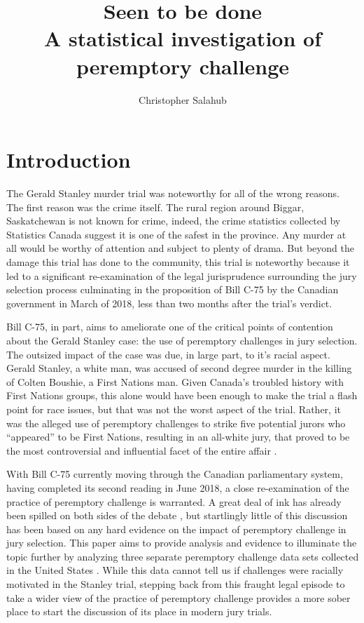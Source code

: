 \documentclass{article}
\title{Seen to be done\\
\large A statistical investigation of peremptory challenge}
\author{Christopher Salahub}
\begin{document}
\maketitle

\section{Introduction} \label{sec:Intro}

The Gerald Stanley murder trial was noteworthy for all of the wrong reasons. The first reason was the crime itself. The rural
region around Biggar, Saskatchewan\cite{StanleyWitnessAccounts} is not known for crime, indeed, the crime statistics collected by
Statistics Canada suggest it is one of the safest in the province\cite{SaskatchewanCrime}. Any murder at all would be worthy of
attention and subject to plenty of drama. But beyond the damage this trial has done to the community, this trial is noteworthy
because it led to a significant re-examination of the legal jurisprudence surrounding the jury selection process culminating in
the proposition of Bill C-75 by the Canadian government in March of 2018\cite{billc75}, less than two months after the trial's
verdict\cite{GeraldStanleyVerdict}.

Bill C-75, in part, aims to ameliorate one of the critical points of contention about the Gerald Stanley case: the use of
peremptory challenges in jury selection. The outsized impact of the case was due, in large part, to it's racial aspect. Gerald
Stanley, a white man, was accused of second degree murder in the killing of Colten Boushie, a First Nations man. Given Canada's
troubled history with First Nations groups, this alone would have been enough to make the trial a flash point for race issues, but
that was not the worst aspect of the trial. Rather, it was the alleged use of peremptory challenges to strike five potential
jurors who ``appeared'' to be First Nations, resulting in an all-white jury, that proved to be the most controversial and
influential facet of the entire affair\cite{fiverejected} \cite{fraughthistory}.

With Bill C-75 currently moving through the Canadian parliamentary system, having completed its second reading in June
2018\cite{c75legisinfo}, a close re-examination of the practice of peremptory challenge is warranted. A great deal of ink has
already been spilled on both sides of the debate \cite{peremparegood} \cite{bothwrong} \cite{goodfirststep}, but startlingly
little of this discussion has been based on any hard evidence on the impact of peremptory challenge in jury selection. This paper
aims to provide analysis and evidence to illuminate the topic further by analyzing three separate peremptory challenge
data sets collected in the United States \cite{JurySunshineProj} \cite{StubbornLegacy} \cite{PerempChalMurder}. While this data
cannot tell us if challenges were racially motivated in the Stanley trial, stepping back from this fraught legal episode to take a
wider view of the practice of peremptory challenge provides a more sober place to start the discussion of its place in modern jury
trials.
\end{document}
